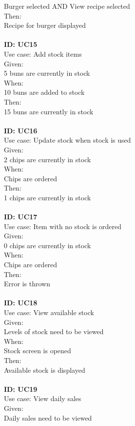 Burger selected AND View recipe selected\\
Then:\\
Recipe for burger displayed\\
\\
\textbf{ID: UC15\\}
Use case: Add stock items\\
Given: \\
5 buns are currently in stock\\
When: \\
10 buns are added to stock\\
Then:\\
15 buns are currently in stock\\
\\
\textbf{ID: UC16\\}
Use case: Update stock when stock is used\\
Given: \\
2 chips are currently in stock\\
When: \\
Chips are ordered\\
Then:\\
1 chips are currently in stock\\
\\
\textbf{ID: UC17\\}
Use case: Item with no stock is ordered\\
Given: \\
0 chips are currently in stock\\
When: \\
Chips are ordered\\
Then:\\
Error is thrown\\
\\
\textbf{ID: UC18\\}
Use case: View available stock\\
Given: \\
Levels of stock need to be viewed\\
When: \\
Stock screen is opened\\
Then:\\
Available stock is displayed\\
\\
\textbf{ID: UC19\\}
Use case: View daily sales\\
Given: \\
Daily sales need to be viewed\\

